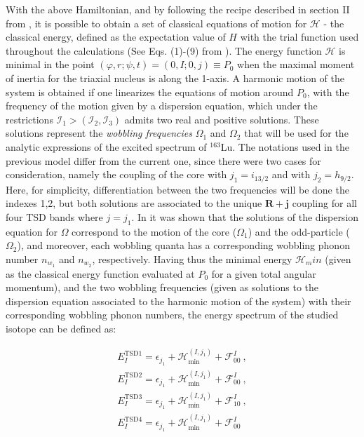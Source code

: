 \documentclass[%
 reprint,
 amsmath,
 amssymb,
 aps,
 floatfix,
]{revtex4-2}
\begin{document}
With the above Hamiltonian, and by following the recipe described in section II from \cite{raduta2020new}, it is possible to obtain a set of classical equations of motion for $\mathcal{H}$ - the classical energy, defined as the expectation value of $H$ with the trial function used throughout the calculations (See Eqs. (1)-(9) from \cite{raduta2020new}). The energy function $\mathcal{H}$ is minimal in the point $(\varphi,r;\psi,t)=(0,I;0,j)\equiv P_0$ when the maximal moment of inertia for the triaxial nucleus is along the 1-axis. A harmonic motion of the system is obtained if one linearizes the equations of motion around $P_0$, with the frequency of the motion given by a dispersion equation, which under the restrictions $\mathcal{I}_1>(\mathcal{I}_2,\mathcal{I_3})$ admits two real and positive solutions. These solutions represent the \emph{wobbling frequencies} $\Omega_1$ and $\Omega_2$ that will be used for the analytic expressions of the excited spectrum of $^{163}$Lu. The notations used in the previous model differ from the current one, since there were two cases for consideration, namely the coupling of the core with $j_1=i_{13/2}$ and with $j_2=h_{9/2}$. Here, for simplicity, differentiation between the two frequencies will be done the indexes 1,2, but both solutions are associated to the unique $\mathbf{R}+\mathbf{j}$ coupling for all four TSD bands where $j=j_1$. In \cite{raduta2017semiclassical} it was shown that the solutions of the dispersion equation for $\Omega$ correspond to the motion of the core ($\Omega_1$) and the odd-particle ($\Omega_2$), and moreover, each wobbling quanta has a corresponding wobbling phonon number $n_{w_1}$ and $n_{w_2}$, respectively. Having thus the minimal energy $\mathcal{H}_min$ (given as the classical energy function evaluated at $P_0$ for a given total angular momentum), and the two wobbling frequencies (given as solutions to the dispersion equation associated to the harmonic motion of the system) with their corresponding wobbling phonon numbers, the energy spectrum of the studied isotope can be defined as:

\begin{align}
    E_I^\text{TSD1}=\epsilon_{j_1} + \mathcal{H}_\text{min}^{(I,j_1)}+\mathcal{F}_{00}^I \nonumber\ ,\\
    E_I^\text{TSD2}=\epsilon_{j_1} + \mathcal{H}_\text{min}^{(I,j_1)}+\mathcal{F}_{00}^I \nonumber\ ,\\
    E_I^\text{TSD3}=\epsilon_{j_1} + \mathcal{H}_\text{min}^{(I,j_1)}+\mathcal{F}_{10}^I \nonumber\ ,\\
    E_I^\text{TSD4}=\epsilon_{j_1} + \mathcal{H}_\text{min}^{(I,j_1)}+\mathcal{F}_{00}^I \label{wobbling_energies}
\end{align}
\end{document}
